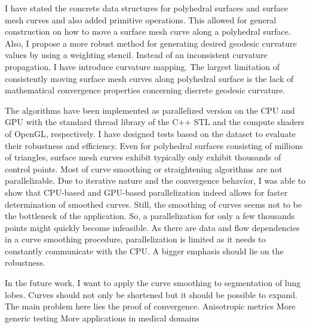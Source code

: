 \documentclass[crop=false]{stdlocal}
\begin{document}
  I have stated the concrete data structures for polyhedral surfaces and surface mesh curves and also added primitive operations.
  This allowed for general construction on how to move a surface mesh curve along a polyhedral surface.
  Also, I propose a more robust method for generating desired geodesic curvature values by using a weighting stencil.
  Instead of an inconsistent curvature propagation, I have introduce curvature mapping.
  The largest limitation of consistently moving surface mesh curves along polyhedral surface is the lack of mathematical convergence properties concerning discrete geodesic curvature.

  The algorithms have been implemented as parallelized version on the CPU and GPU with the standard thread library of the C++ STL and the compute shaders of OpenGL, respectively.
  I have designed tests based on the  dataset to evaluate their robustness and efficiency.
  Even for polyhedral surfaces consisting of millions of triangles, surface mesh curves exhibit typically only exhibit thousands of control points.
  Most of curve smoothing or straightening algorithms are not parallelizable.
  Due to iterative nature and the convergence behavior, I was able to show that CPU-based and GPU-based parallelization indeed allows for faster determination of smoothed curves.
  Still, the smoothing of curves seems not to be the bottleneck of the application.
  So, a parallelization for only a few thousands points might quickly become infeasible.
  As there are data and flow dependencies in a curve smoothing procedure, parallelization is limited as it needs to constantly communicate with the CPU.
  A bigger emphasis should lie on the robustness.

  In the future work, I want to apply the curve smoothing to segmentation of lung lobes.
  Curves should not only be shortened but it should be possible to expand. The main problem here lies the proof of convergence.
  Anisotropic metrics
  More generic testing
  More applications in medical domains

\end{document}

